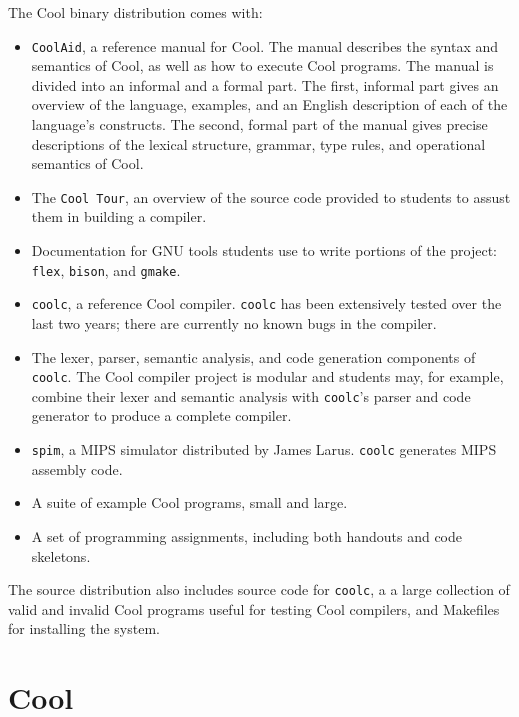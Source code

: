 The Cool binary distribution comes with:
\begin{itemize}

\item {\tt CoolAid}, a reference manual for Cool.  The manual describes
the syntax and semantics of Cool, as well as how to execute Cool programs.
The manual is divided into an informal and a formal part.  The first, informal
part gives an overview of the language, examples, and an English description
of each of the language's constructs.  The second, formal part of the manual
gives precise descriptions of the lexical structure, grammar, type rules,
and operational semantics of Cool.

\item The {\tt Cool Tour}, an overview of the source code provided to students
to assust them in building a compiler.

\item Documentation for GNU
      tools students use to write portions of the project: {\tt flex}, {\tt bison}, and {\tt gmake}.

\item {\tt coolc}, a reference Cool compiler.  {\tt coolc} has been extensively
tested over the last two years; there are currently no known bugs in the 
compiler.

\item The lexer, parser, semantic analysis, and code generation components
of {\tt coolc}.  The Cool compiler project is modular and
students may, for example, combine their lexer and semantic analysis with
{\tt coolc}'s parser and code generator to produce a complete compiler.

\item {\tt spim}, a MIPS simulator distributed by James Larus.  {\tt coolc}
generates MIPS assembly code.

\item A suite of example Cool programs, small and large. 

\item A set of programming assignments, including both handouts and code
skeletons.

\end{itemize}

The source distribution also includes source code for {\tt coolc}, a
a large collection of valid and invalid Cool programs useful for
testing Cool compilers, and Makefiles for installing the system.

\section{Cool}

